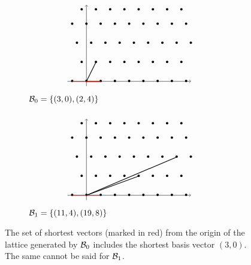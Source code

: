 \documentclass[a4paper,12pt]{article}
\begin{document}
\begin{figure}[H]
    \centering
    \begin{subfigure}{.5\textwidth}
        $$
        \begin{tikzpicture}[scale=0.2]
        \draw[->, thin] (-4,0)--(22,0) node [right] {}; 
        \draw[->, thin] (0,-1)--(0,16) node [above] {};
        \foreach \Point in {(-3,0), (0,0), (3,0), (6,0), (9,0), (12,0), (15,0), (18,0), (21,0), (-1,4), (2,4), (5,4), (8,4), (11,4), (14,4), (17,4), (20,4), (-2,8), (1,8), (4,8), (7,8), (10,8), (13,8), (16,8), (19,8), (22,8), (-3,12), (0,12), (3,12), (6,12), (9,12), (12,12), (15,12), (18,12), (21,12), (-1,15), (2,15), (5,15), (8,15), (11,15), (14,15), (17,15), (20,15)}{
            \node at \Point {\textbullet};    
        }
        \draw[thick] (0,0)--(3,0);
        \draw[thick] (0,0)--(2,4);
        \draw[style=very thick, color=red] (0,0)--(3,0);
        \draw[thick, color=red] (0,0)--(-3,0);
        \end{tikzpicture}
        $$
        \caption{$\mathcal{B}_0 = \lbrace (3,0), (2,4) \rbrace$}
    \end{subfigure}%
    \begin{subfigure}{.5\textwidth}
        $$
        \begin{tikzpicture}[scale=0.2]
        \draw[->, thin] (-4,0)--(22,0) node [right] {}; 
        \draw[->, thin] (0,-1)--(0,16) node [above] {};
        \foreach \Point in {(-3,0), (0,0), (3,0), (6,0), (9,0), (12,0), (15,0), (18,0), (21,0), (-1,4), (2,4), (5,4), (8,4), (11,4), (14,4), (17,4), (20,4), (-2,8), (1,8), (4,8), (7,8), (10,8), (13,8), (16,8), (19,8), (22,8), (-3,12), (0,12), (3,12), (6,12), (9,12), (12,12), (15,12), (18,12), (21,12), (-1,15), (2,15), (5,15), (8,15), (11,15), (14,15), (17,15), (20,15)}{
            \node at \Point {\textbullet};    
        }
        \draw[thick] (0,0)--(19,8);
        \draw[thick] (0,0)--(11,4);
        \draw[thick, color=red] (0,0)--(3,0);
        \draw[thick, color=red] (0,0)--(-3,0);
        \end{tikzpicture}
        $$
        \caption{$\mathcal{B}_1 = \lbrace (11,4), (19,8) \rbrace$} 
    \end{subfigure}%
    \caption{The set of shortest vectors (marked in red) from the origin of the lattice generated by $\mathcal{B}_0$ includes the shortest basis vector $(3,0)$. The same cannot be said for $\mathcal{B}_1$.}
\end{figure}
\end{document}
